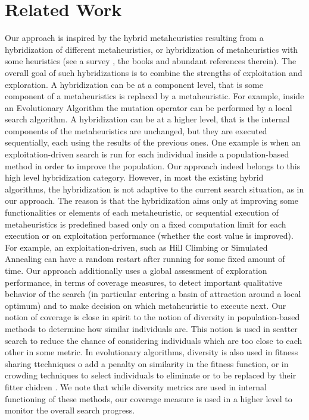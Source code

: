 \section{Related Work}
Our approach is inspired by the hybrid metaheuristics resulting from a hybridization of different metaheuristics, or hybridization of metaheuristics with some heuristics (see a survey \cite{Talbi2009}, the books \cite{Lones2011,Talbi2013} and abundant references therein). The overall goal of such hybridizations is to combine the strengths of exploitation and exploration. A hybridization can be at a component level, that is some component of a metaheuristics is replaced by a metaheuristic. For example, inside an Evolutionary Algorithm the mutation operator can be performed by a local search algorithm. A hybridization can be at a higher level, that is the internal components of the metaheuristics are unchanged, but they are executed sequentially, each using the results of the previous ones. One example is when an exploitation-driven search is run for each individual inside a population-based method in order to improve the population. Our approach indeed belongs to this high level hybridization category. However, in most the existing hybrid algorithms, the hybridization is not adaptive to the current search situation, as in our approach. The reason is that the hybridization aims only at improving some functionalities or elements of each metaheuristic, or sequential execution of metaheuristics is predefined based only on a fixed computation limit for each execution or on exploitation performance (whether the cost value is improved). For example, an exploitation-driven, such as Hill Climbing or Simulated Annealing can have a random restart after running for some fixed amount of time. Our approach additionally uses a global assessment of exploration performance, in terms of coverage measures, to detect important qualitative behavior of the search (in particular entering a basin of attraction around a local optimum) and to make decision on which metaheuristic to execute next. Our notion of coverage is close in spirit to the notion of diversity in population-based methods to determine how similar individuals are. This notion is used in scatter search \cite{Glover2011} to reduce the chance of considering individuals which are too close to each other in some metric. In evolutionary algorithms, diversity is also used in fitness sharing ttechniques o add a penalty on similarity in the fitness function, or in crowding techniques to select individuals to eliminate or to be replaced by their fitter chidren \cite{WongWMPZ2012}. We note that while diversity metrics are used in internal functioning of these methods, our coverage measure is used in a higher level to monitor the overall search progress.
